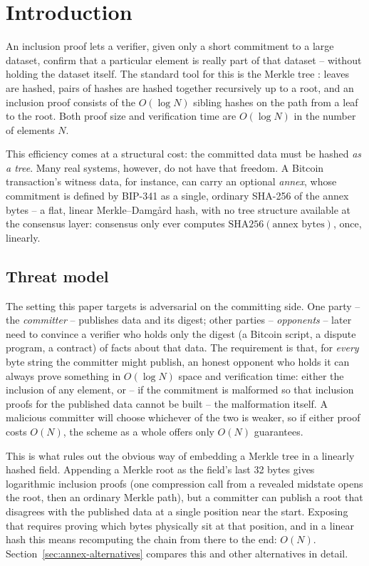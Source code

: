 \section{Introduction}
\label{sec:intro}

An inclusion proof lets a verifier, given only a short commitment to a large
dataset, confirm that a particular element is really part of that dataset --
without holding the dataset itself. The standard tool for this is the Merkle
tree \citep{merkle1980}: leaves are hashed, pairs of hashes are hashed
together recursively up to a root, and an inclusion proof consists of the
$O(\log N)$ sibling hashes on the path from a leaf to the root. Both proof
size and verification time are $O(\log N)$ in the number of elements $N$.

This efficiency comes at a structural cost: the committed data must be hashed
\emph{as a tree}. Many real systems, however, do not have that freedom. A
Bitcoin transaction's witness data, for instance, can carry an optional
\emph{annex}, whose commitment is defined by BIP-341 \citep{bip341} as a
single, ordinary SHA-256 of the annex bytes -- a flat, linear
Merkle--Damg\aa rd hash, with no tree structure available at the consensus
layer: consensus only ever computes $\mathrm{SHA256}(\text{annex bytes})$,
once, linearly.

\subsection*{Threat model}

The setting this paper targets is adversarial on the committing side. One
party -- the \emph{committer} -- publishes data and its digest; other
parties -- \emph{opponents} -- later need to convince a verifier who holds
only the digest (a Bitcoin script, a dispute program, a contract) of facts
about that data. The requirement is that, for \emph{every} byte string the
committer might publish, an honest opponent who holds it can always prove
something in $O(\log N)$ space and verification time: either the
inclusion of any element, or -- if the commitment is malformed so that
inclusion proofs for the published data cannot be built -- the
malformation itself. A malicious committer will choose whichever of the
two is weaker, so if either proof costs $O(N)$, the scheme as a whole
offers only $O(N)$ guarantees.

This is what rules out the obvious way of embedding a Merkle tree in a
linearly hashed field. Appending a Merkle root as the field's last 32 bytes
gives logarithmic inclusion proofs (one compression call from a revealed
midstate opens the root, then an ordinary Merkle path), but a committer can
publish a root that disagrees with the published data at a single position
near the start. Exposing that requires proving which bytes physically sit at
that position, and in a linear hash this means recomputing the chain from
there to the end: $O(N)$. Section~\ref{sec:annex-alternatives} compares this
and other alternatives in detail.

